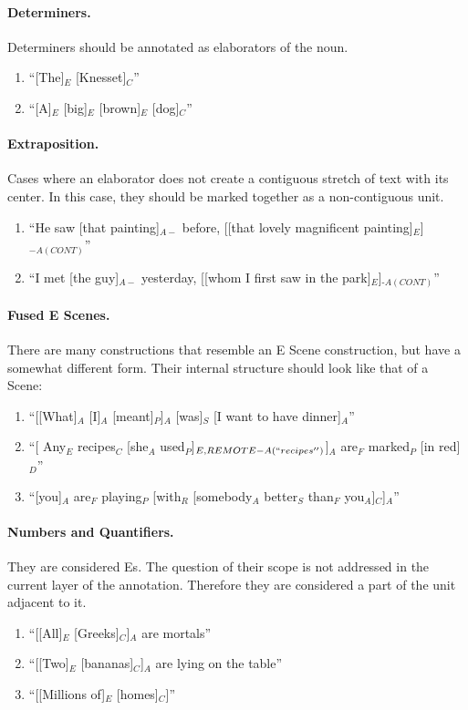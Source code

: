 \documentclass[11pt]{article}
\newcommand{\be}{\begin{enumerate}}
\newcommand{\ee}{\end{enumerate}}
\begin{document}
\paragraph{Determiners.} Determiners should be annotated as elaborators of the noun.
\be \item
``[The]$_E$ [Knesset]$_C$''
\item
``[A]$_E$ [big]$_E$ [brown]$_E$ [dog]$_C$''
\ee

\paragraph{Extraposition.} Cases where an elaborator does not create a contiguous stretch of text with its center. In this case, they should be marked together as a non-contiguous unit.
\be
\item
``He saw [that painting]$_{A-}$ before, [[that lovely magnificent painting]$_E$]$_{-A(CONT)}$''
\item
``I met [the guy]$_{A-}$ yesterday, [[whom I first saw in the park]$_E$]$_{‑A(CONT)}$''
\ee

\paragraph{Fused E Scenes.} There are many constructions that resemble an E Scene construction, but have a somewhat different form. Their internal structure should look like that of a Scene:
\be \item
``[[What]$_A$ [I]$_A$ [meant]$_P$]$_A$ [was]$_S$ [I want to have dinner]$_A$''
\item
``[ Any$_E$ recipes$_C$ [she$_A$ used$_P$]$_{E,REMOTE-A(``recipes'')}$]$_A$ are$_F$ marked$_P$ [in red]$_D$''
\item
``[you]$_A$ are$_F$ playing$_P$ [with$_R$ [somebody$_A$ better$_S$ than$_F$ you$_A$]$_C$]$_A$''
\ee

\paragraph{Numbers and Quantifiers.} They are considered Es. The question of their scope is not addressed in the current layer of the annotation. Therefore they are considered a part of the unit adjacent to it.
\be
\item
``[[All]$_E$ [Greeks]$_C$]$_A$ are mortals''
\item
``[[Two]$_E$ [bananas]$_C$]$_A$ are lying on the table''
\item
``[[Millions of]$_E$ [homes]$_C$]''
\ee
\end{document}
